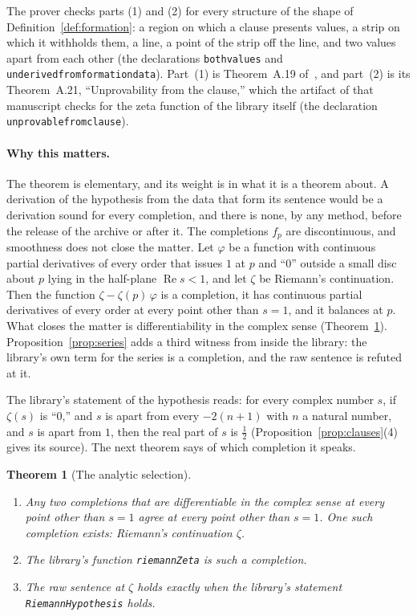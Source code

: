 \documentclass[11pt]{article}
\newtheorem{theorem}{Theorem}[section]
\theoremstyle{definition}
\theoremstyle{remark}
\newcommand{\re}{\operatorname{Re}}
\DeclareRobustCommand{\lean}[1]{{\renewcommand{\_}{\textunderscore\allowbreak}\texttt{#1}}}
\begin{document}
\noindent The prover checks parts (1) and (2) for every structure of the shape of Definition~\ref{def:formation}: a region on which a clause presents values, a strip on which it withholds them, a line, a point of the strip off the line, and two values apart from each other (the declarations \lean{both\_values} and \lean{underived\_from\_formation\_data}). Part~(1) is Theorem~A.19 of~\citet{tv}, and part~(2) is its Theorem~A.21, ``Unprovability from the clause,'' which the artifact of that manuscript checks for the zeta function of the library itself (the declaration \lean{unprovable\_from\_clause}).

\paragraph{Why this matters.} The theorem is elementary, and its weight is in what it is a theorem about. A derivation of the hypothesis from the data that form its sentence would be a derivation sound for every completion, and there is none, by any method, before the release of the archive or after it. The completions $f_p$ are discontinuous, and smoothness does not close the matter. Let $\varphi$ be a function with continuous partial derivatives of every order that issues $1$ at $p$ and ``0'' outside a small disc about $p$ lying in the half-plane $\re s<1$, and let $\zeta$ be Riemann's continuation. Then the function $\zeta-\zeta(p)\,\varphi$ is a completion, it has continuous partial derivatives of every order at every point other than $s=1$, and it balances at $p$. What closes the matter is differentiability in the complex sense (Theorem~\ref{thm:selection}). Proposition~\ref{prop:series} adds a third witness from inside the library: the library's own term for the series is a completion, and the raw sentence is refuted at it.

The library's statement of the hypothesis reads: for every complex number $s$, if $\zeta(s)$ is ``0,'' and $s$ is apart from every $-2(n+1)$ with $n$ a natural number, and $s$ is apart from $1$, then the real part of $s$ is $\tfrac12$ (Proposition~\ref{prop:clauses}(4) gives its source). The next theorem says of which completion it speaks.

\begin{theorem}[The analytic selection]\label{thm:selection}
\leavevmode
\begin{enumerate}[leftmargin=2em,itemsep=1pt]
\item Any two completions that are differentiable in the complex sense at every point other than $s=1$ agree at every point other than $s=1$. One such completion exists: Riemann's continuation $\zeta$.
\item The library's function \lean{riemannZeta} is such a completion.
\item The raw sentence at $\zeta$ holds exactly when the library's statement \lean{RiemannHypothesis} holds.
\end{enumerate}
\end{theorem}
\end{document}
